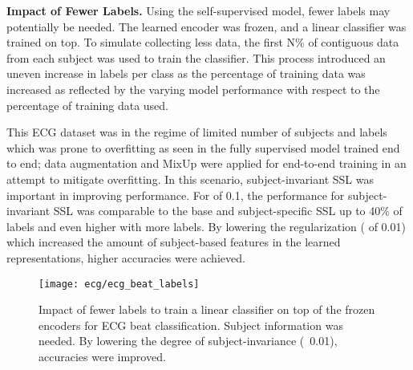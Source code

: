 \documentclass{article}
\renewcommand{\paragraph}[1]{\textbf{#1}\hspace{1em}}
\begin{document}
\paragraph{Impact of Fewer Labels.} Using the self-supervised model, fewer
labels may potentially be needed. The learned encoder was frozen, and a linear
classifier was trained on top. To simulate collecting less data, the first N\%
of contiguous data from each subject was used to train the classifier. This
process introduced an uneven increase in labels per class as the percentage of
training data was increased as reflected by the varying model performance with
respect to the percentage of training data used.

This ECG dataset was in the regime of limited number of subjects and labels
which was prone to overfitting as seen in the fully supervised model trained end
to end; data augmentation and MixUp \cite{zhang_mixup_2018} were applied for
end-to-end training in an attempt to mitigate overfitting. In this scenario,
subject-invariant SSL was important in improving performance. For  of
0.1, the performance for subject-invariant SSL was comparable to the base and
subject-specific SSL up to 40\% of labels and even higher with more labels. By
lowering the regularization ( of 0.01) which increased the amount of
subject-based features in the learned representations, higher accuracies were
achieved.

\begin{figure}
  \centering
  \begin{minipage}[c]{0.68\textwidth}
    \texttt{[image: ecg/ecg\_beat\_labels]}
  \end{minipage}\hfill
  \begin{minipage}[c]{0.32\textwidth}
    \caption{Impact of fewer labels to train a linear classifier on top of the
    frozen encoders for ECG beat classification. Subject information was needed.
    By lowering the degree of subject-invariance (~0.01), accuracies
    were improved.}
    \label{fig:ecg:labels}
  \end{minipage}
\end{figure}
\end{document}
